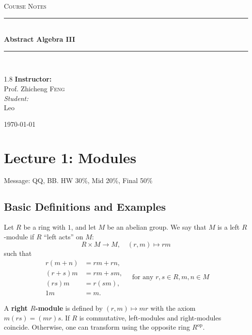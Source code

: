\documentclass[11pt, a4paper]{report}
\newcommand{\HRule}[1]{\rule{\linewidth}{#1}}
\begin{document}
\begin{titlepage}
    \centering
    \vspace*{2cm}
    
    \textsc{\Large Course Notes}\\[0.5cm]

    \HRule{1.5pt} \\[0.5cm]
    { \huge \bfseries Abstract Algebra III }\\[0.4cm] 
    \HRule{1.5pt} \\[1.5cm]
    
    \vspace{3cm}

    \begin{spacing}{1.8}
        {\Large \textbf{Instructor:}} \\
        {\Large Prof. Zhicheng \textsc{Feng}} \\[0.8cm]
        
        {\normalsize \textit{Student:}} \\
        {\normalsize Leo}
    \end{spacing}

    \vfill
    {\large \today}
\end{titlepage}
\newpage
\tableofcontents
\newpage


\chapter{Lecture 1: Modules}

Message: QQ, BB. HW 30\%, Mid 20\%, Final 50\%

\section{Basic Definitions and Examples}

\begin{definition}
Let $R$ be a ring with $1$, and let $M$ be an abelian group. We say that $M$ is a left $R$-module if $R$ ``left acts'' on $M$:
\[
R \times M \rightarrow M, \quad (r, m) \mapsto rm
\]
such that
\[
\begin{aligned}
r(m+n) &= rm + rn, \\
(r+s)m &= rm + sm, \\
(rs)m &= r(sm), \\
1m &= m.
\end{aligned}
\quad \text{for any } r, s \in R, m,n \in M
\]

A \textbf{right $R$-module} is defined by $(r, m) \mapsto mr$ with the axiom $m(rs) = (mr)s$. If $R$ is commutative, left-modules and right-modules coincide. Otherwise, one can transform using the opposite ring $R^{\mathrm{op}}$.
\end{definition}
\end{document}
